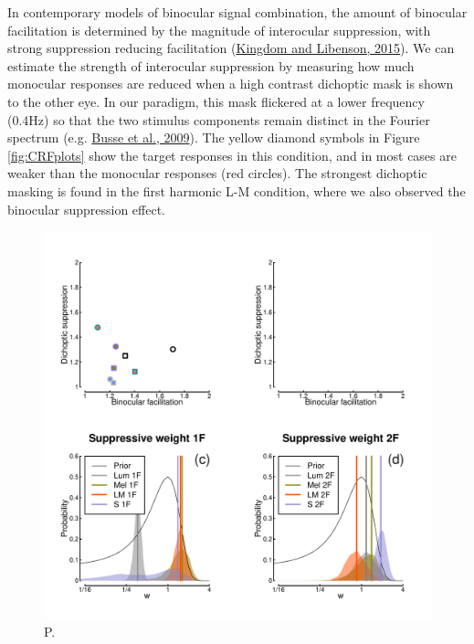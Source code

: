 \documentclass[
]{article}
\begin{document}
In contemporary models of binocular signal combination, the amount of binocular facilitation is determined by the magnitude of interocular suppression, with strong suppression reducing facilitation (\protect\hyperlink{ref-Kingdom2015}{Kingdom and Libenson, 2015}). We can estimate the strength of interocular suppression by measuring how much monocular responses are reduced when a high contrast dichoptic mask is shown to the other eye. In our paradigm, this mask flickered at a lower frequency (0.4Hz) so that the two stimulus components remain distinct in the Fourier spectrum (e.g. \protect\hyperlink{ref-Busse2009}{Busse et al., 2009}). The yellow diamond symbols in Figure \ref{fig:CRFplots} show the target responses in this condition, and in most cases are weaker than the monocular responses (red circles). The strongest dichoptic masking is found in the first harmonic L-M condition, where we also observed the binocular suppression effect.

\begin{figure}

{\centering \includegraphics{Figures/suppressionfig} 

}

\caption{P.}\label{fig:suppressionfig}
\end{figure}
\end{document}
